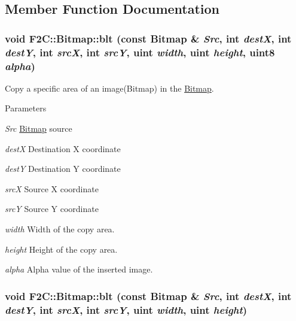 \subsection{Member Function Documentation}
\hypertarget{class_f2_c_1_1_bitmap_ad2ed409040de1fd555e25c04b89062b6}{
\subsubsection[{blt}]{\setlength{\rightskip}{0pt plus 5cm}void F2C::Bitmap::blt (const {\bf Bitmap} \& {\em Src}, \/  int {\em destX}, \/  int {\em destY}, \/  int {\em srcX}, \/  int {\em srcY}, \/  {\bf uint} {\em width}, \/  {\bf uint} {\em height}, \/  {\bf uint8} {\em alpha})}}
\label{class_f2_c_1_1_bitmap_ad2ed409040de1fd555e25c04b89062b6}


Copy a specific area of an image(Bitmap) in the \hyperlink{class_f2_c_1_1_bitmap}{Bitmap}. 
\begin{DoxyParams}{Parameters}
\item[{\em Src}]\hyperlink{class_f2_c_1_1_bitmap}{Bitmap} source \item[{\em destX}]Destination X coordinate \item[{\em destY}]Destination Y coordinate \item[{\em srcX}]Source X coordinate \item[{\em srcY}]Source Y coordinate \item[{\em width}]Width of the copy area. \item[{\em height}]Height of the copy area. \item[{\em alpha}]Alpha value of the inserted image. \end{DoxyParams}
\hypertarget{class_f2_c_1_1_bitmap_a4fc2795eb440a68d9409db64669e8ef1}{
\subsubsection[{blt}]{\setlength{\rightskip}{0pt plus 5cm}void F2C::Bitmap::blt (const {\bf Bitmap} \& {\em Src}, \/  int {\em destX}, \/  int {\em destY}, \/  int {\em srcX}, \/  int {\em srcY}, \/  {\bf uint} {\em width}, \/  {\bf uint} {\em height})}}
\label{class_f2_c_1_1_bitmap_a4fc2795eb440a68d9409db64669e8ef1}


